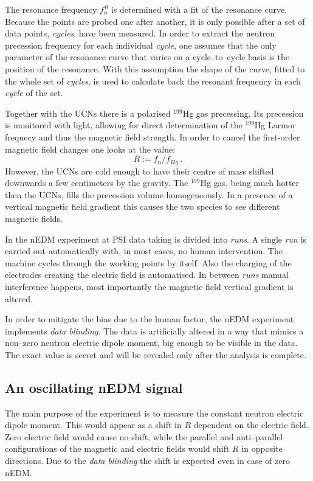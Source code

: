 The resonance frequency $f_n^{\,0}$ is determined with a fit of the resonance curve. Because the points are probed one after another, it is only possible after a set of data points, \emph{cycles}, have been measured. In order to extract the neutron precession frequency for each individual \emph{cycle}, one assumes that the only parameter of the resonance curve that varies on a cycle--to--cycle basis is the position of the resonance. With this assumption the shape of the curve, fitted to the whole set of \emph{cycles}, is used to calculate back the resonant frequency in each \emph{cycle} of the set.

Together with the UCNs there is a polarised $^{199}$Hg gas precessing. Its precession is monitored with light, allowing for direct determination of the $^{199}$Hg Larmor frequecy and thus the magnetic field strength. In order to cancel the first-order magnetic field changes one looks at the value:
\begin{equation}
  R := f_n / f_{Hg} \ .
\end{equation}
However, the UCNs are cold enough to have their centre of mass shifted downwards a few centimeters by the gravity. The $^{199}$Hg gas, being much hotter then the UCNs, fills the precession volume homogeneously. In a presence of a vertical magnetic field gradient this causes the two species to see different magnetic fields.

In the nEDM experiment at PSI data taking is divided into \emph{runs}. A single \emph{run} is carried out automatically with, in most cases, no human intervention. The machine cycles through the working points by itself. Also the charging of the electrodes creating the electric field is automatised. In between \emph{runs} manual interference happens, most importantly the magnetic field vertical gradient is altered.

In order to mitigate the bias due to the human factor, the nEDM experiment implements \emph{data blinding}. The data is artificially altered in a way that mimics a non--zero neutron electric dipole moment, big enough to be visible in the data. The exact value is secret and will be revealed only after the analysis is complete.


\subsection{An oscillating nEDM signal}
The main purpose of the experiment is to measure the constant neutron electric dipole moment. This would appear as a shift in $R$ dependent on the electric field. Zero electric field would cause no shift, while the parallel and anti--parallel configurations of the magnetic and electric fields would shift $R$ in opposite directions. Due to the \emph{data blinding} the shift is expected even in case of zero nEDM.

